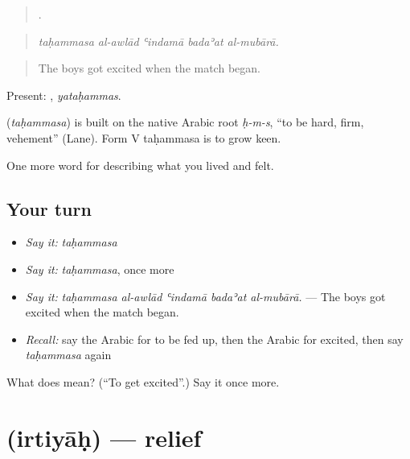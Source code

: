 \begin{quote}
    .
\end{quote}

\begin{quote}
\emph{taḥammasa al-awlād ʿindamā badaʾat al-mubārā.}
\end{quote}

\begin{quote}
The boys got excited when the match began.
\end{quote}

Present: , \emph{yataḥammas}.

\begin{cousinweb}
\textbf{} (\emph{taḥammasa}) is built on the native Arabic root \emph{ḥ-m-s}, \textquotedblleft{}to be hard, firm, vehement\textquotedblright{} (Lane). Form V taḥammasa is to grow keen.
\end{cousinweb}

\begin{grammarlens}[title={What you've built}]
One more word for describing what you lived and felt.
\end{grammarlens}

\subsection*{Your turn}
\begin{itemize}
\raggedright
  \item \emph{Say it:} \emph{taḥammasa}
  \item \emph{Say it:} \emph{taḥammasa}, once more
  \item \emph{Say it:} \emph{taḥammasa al-awlād ʿindamā badaʾat al-mubārā.} — The boys got excited when the match began.
  \item \emph{Recall:} say the Arabic for to be fed up, then the Arabic for excited, then say \emph{taḥammasa} again
\end{itemize}

\begin{tcolorbox}[breakable,colback=teal!4,colframe=teal!35!black,title={Before you move on}]
What does  mean? (\textquotedblleft{}To get excited\textquotedblright{}.) Say it once more.
\end{tcolorbox}
\section[\texorpdfstring{\ar{ارتياح} (irtiyāḥ)}{ارتياح (irtiyāḥ)}]{ (irtiyāḥ) — relief}

